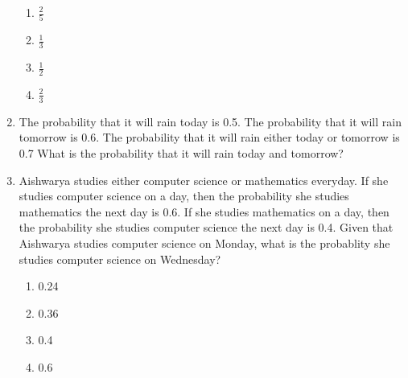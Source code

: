\documentclass[journal,12pt,twocolumn]{IEEEtran}
\begin{document}
\begin{enumerate}
\begin{enumerate}
\item $ \frac{2}{5}$\\
\item $\frac{1}{3}$\\
\item $ \frac{1}{2}$\\
\item $\frac{2}{3}$

\end{enumerate}  
%
%
%
\item The probability that it will rain today is 0.5. The probability that it will rain tomorrow is 0.6. The probability that it will rain either today or tomorrow is 0.7 What is the probability that it will rain today and tomorrow?
%
\solution

\item Aishwarya studies either computer science or mathematics everyday. If she studies computer science on a day, then the probability she studies mathematics the next day is 0.6. If she studies mathematics on a day, then the probability she studies computer science the next day is 0.4.
Given that Aishwarya studies computer science on Monday, what is the probablity she studies computer science on Wednesday?
\begin{enumerate}[label=(\Alph*)]

\item 0.24
\item 0.36
\item 0.4
\item 0.6

\end{enumerate}
%
\solution



\end{enumerate}
\end{document}
